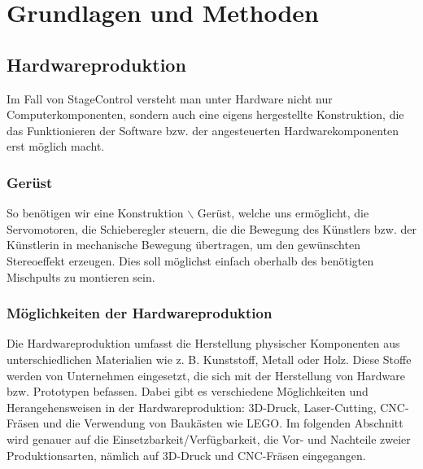 
\pagestyle{fancy} \frenchspacing
\renewcommand{\chaptermark}[1]{\markboth{#1}{}}

\renewcommand{\textfraction}{0}
\renewcommand{\floatpagefraction}{0.999}
\renewcommand{\topfraction}{0.7}
\renewcommand{\bottomfraction}{0.999}
\lfoot{}


\fancyhf{} %





\chapter{Grundlagen und Methoden}

\section{Hardwareproduktion} \label{Hardwareproduktion}
Im Fall von StageControl versteht man unter Hardware nicht nur Computerkomponenten, sondern auch eine eigens hergestellte Konstruktion, die das Funktionieren der Software bzw. der angesteuerten Hardwarekomponenten erst möglich macht.

\subsection{Gerüst}
So benötigen wir eine Konstruktion $\backslash$ Gerüst, welche uns ermöglicht, die Servomotoren, die Schieberegler steuern, die die Bewegung des Künstlers bzw. der Künstlerin in mechanische Bewegung übertragen, um den gewünschten Stereoeffekt erzeugen. Dies soll möglichst einfach oberhalb des benötigten Mischpults zu montieren sein.


\subsection{Möglichkeiten der Hardwareproduktion}
Die Hardwareproduktion umfasst die Herstellung physischer Komponenten aus unterschiedlichen Materialien wie z. B. Kunststoff, Metall oder Holz. Diese Stoffe werden von Unternehmen eingesetzt, die sich mit der Herstellung von Hardware bzw. Prototypen befassen. Dabei gibt es verschiedene Möglichkeiten und Herangehensweisen in der Hardwareproduktion: 3D-Druck, Laser-Cutting, CNC-Fräsen und die Verwendung von Baukästen wie LEGO. Im folgenden Abschnitt wird genauer auf die Einsetzbarkeit/Verfügbarkeit, die Vor- und Nachteile zweier Produktionsarten, nämlich auf 3D-Druck und CNC-Fräsen eingegangen.

